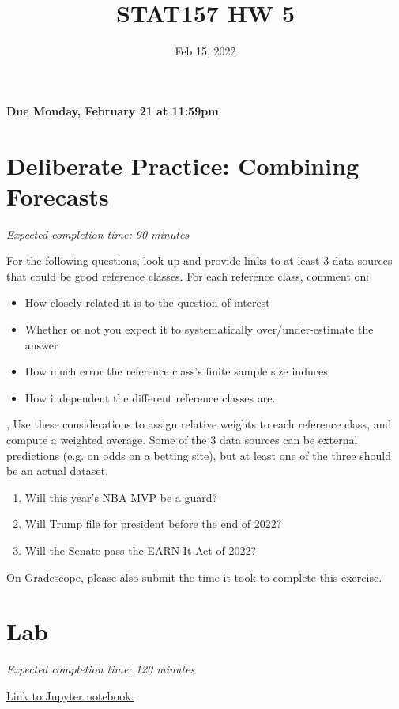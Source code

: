 \documentclass[11pt]{article}
\title{STAT157 HW 5}
\date{Feb 15, 2022}
\begin{document}
\maketitle

\hfill \textbf{Due Monday, February 21 at 11:59pm}

\section*{Deliberate Practice: Combining Forecasts}

\emph{Expected completion time: 90 minutes}


For the following questions, look up and provide links to at least 3 data sources that could be good reference classes. For each reference class, comment on: 
\begin{itemize}
	\item How closely related it is to the question of interest
	\item Whether or not you expect it to systematically over/under-estimate the answer
	\item How much error the reference class's finite sample size induces
	\item How independent the different reference classes are.
\end{itemize}, 
Use these considerations to assign relative weights to each reference class, and compute a weighted average. Some of the 3 data sources can be external predictions (e.g. on odds on a betting site), but at least one of the three should be an actual dataset.

\begin{enumerate}
	\item Will this year's NBA MVP be a guard?
	\item Will Trump file for president before the end of 2022?
	\item Will the Senate pass the \href{https://www.congress.gov/bill/117th-congress/senate-bill/3538}{EARN It Act of 2022}?
\end{enumerate}

On Gradescope, please also submit the time it took to complete this exercise.

\section*{Lab}

\emph{Expected completion time: 120 minutes}

\href{https://bit.ly/34T4SlQ}{Link to Jupyter notebook.}
\end{document}
